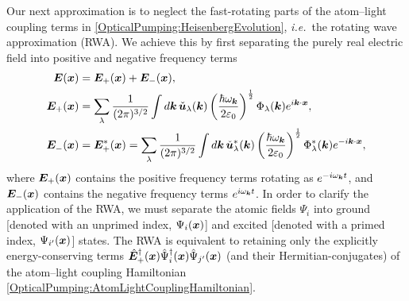 Our next approximation is to neglect the fast-rotating parts of the atom--light coupling terms in \eqref{OpticalPumping:HeisenbergEvolution}, \emph{i.e.}\  the rotating wave approximation (RWA).  We achieve this by first separating the purely real electric field into positive and negative frequency terms
\begin{align}
    \bm{E}(\bm{x}) &= \bm{E}_+(\bm{x}) + \bm{E}_-(\bm{x}), \\
    \bm{E}_+(\bm{x}) &= \sum_\lambda \frac{1}{(2\pi)^{3/2}} \int d \bm{k}\, \check{\bm{u}}_\lambda(\bm{k}) \left(\frac{\hbar \omega_{\bm{k}}}{2 \varepsilon_0}\right)^{\frac{1}{2}} \Phi_\lambda(\bm{k}) e^{i \bm{k} \cdot \bm{x}},\\
    \bm{E}^{\phantom{*}}_-(\bm{x}) &= \bm{E}_+^*(\bm{x}) = \sum_\lambda \frac{1}{(2\pi)^{3/2}} \int d \bm{k}\, \check{\bm{u}}^*_\lambda(\bm{k}) \left(\frac{\hbar \omega_{\bm{k}}}{2 \varepsilon_0}\right)^{\frac{1}{2}} \Phi^*_\lambda(\bm{k}) e^{-i \bm{k} \cdot \bm{x}},
\end{align}
where $\bm{E}_+(\bm{x})$ contains the positive frequency terms rotating as $e^{-i \omega_{\bm{k}} t}$, and $\bm{E}_-(\bm{x})$ contains the negative frequency terms $e^{i \omega_{\bm{k}} t}$.  In order to clarify the application of the RWA, we must separate the atomic fields $\Psi_i$ into ground [denoted with an unprimed index, $\Psi_i(\bm{x})$] and excited [denoted with a primed index, $\Psi_{i'}(\bm{x})$] states.  The RWA is equivalent to retaining only the explicitly energy-conserving terms $\hat{\bm{E}}_+^\dagger(\bm{x})\hat{\Psi}_i^\dagger(\bm{x}) \hat{\Psi}_{j'}(\bm{x})$ (and their Hermitian-conjugates) of the atom--light coupling Hamiltonian \eqref{OpticalPumping:AtomLightCouplingHamiltonian}.  

